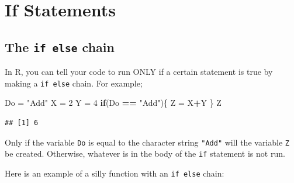 \documentclass[
]{book}
\newenvironment{Shaded}{\begin{snugshade}}{\end{snugshade}}
\newcommand{\ControlFlowTok}[1]{\textcolor[rgb]{0.13,0.29,0.53}{\textbf{#1}}}
\newcommand{\DecValTok}[1]{\textcolor[rgb]{0.00,0.00,0.81}{#1}}
\newcommand{\NormalTok}[1]{#1}
\newcommand{\OperatorTok}[1]{\textcolor[rgb]{0.81,0.36,0.00}{\textbf{#1}}}
\newcommand{\StringTok}[1]{\textcolor[rgb]{0.31,0.60,0.02}{#1}}
\begin{document}
\hypertarget{if-statements}{%
\chapter{If Statements}\label{if-statements}}

\hypertarget{the-if-else-chain}{%
\section{\texorpdfstring{The \texttt{if\ else} chain}{The if else chain}}\label{the-if-else-chain}}

In R, you can tell your code to run ONLY if a certain statement is true by making a \texttt{if\ else} chain. For example;

\begin{Shaded}
\begin{Highlighting}[]
\NormalTok{Do =}\StringTok{ "Add"}
\NormalTok{X =}\StringTok{ }\DecValTok{2}
\NormalTok{Y =}\StringTok{ }\DecValTok{4}
\ControlFlowTok{if}\NormalTok{(Do }\OperatorTok{==}\StringTok{ "Add"}\NormalTok{)\{}
\NormalTok{  Z =}\StringTok{ }\NormalTok{X}\OperatorTok{+}\NormalTok{Y}
\NormalTok{\}}
\NormalTok{Z}
\end{Highlighting}
\end{Shaded}

\begin{verbatim}
## [1] 6
\end{verbatim}

Only if the variable \texttt{Do} is equal to the character string \texttt{"Add"} will the variable \texttt{Z} be created. Otherwise, whatever is in the body of the \texttt{if} statement is not run.

Here is an example of a silly function with an \texttt{if\ else} chain:
\end{document}
